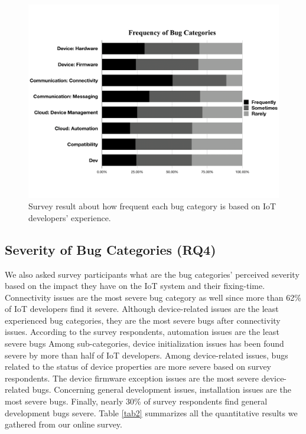  \begin{figure}%
  \centering
   \includegraphics[width=\linewidth]{imgs/bugFreq}
  \caption{Survey result about how frequent each bug category is based on IoT developers' experience.}
  \label{fig:bugFreq}
\end{figure}

\subsection{Severity of Bug Categories (RQ4)}
We also asked survey participants what are the bug categories' perceived severity based on the impact they have on the IoT system and their fixing-time. Connectivity issues are the most severe bug category as well since more than 62\% of IoT developers find it severe. Although device-related issues are the least experienced bug categories, they are the most severe bugs after connectivity issues. According to the survey respondents, automation issues are the least severe bugs Among sub-categories, device initialization issues has been found severe by more than half of IoT developers. Among device-related issues, bugs related to the status of device properties are more severe based on survey respondents. The device firmware exception issues are the most severe device-related bugs. Concerning general development issues, installation issues are the most  severe bugs. Finally, nearly 30\% of survey respondents find general development bugs severe.  Table \ref{tab2} summarizes all the quantitative results we gathered from our online survey.

